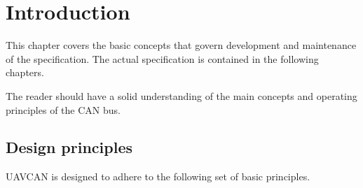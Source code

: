 \chapter{Introduction}\label{sec:introduction}

This chapter covers the basic concepts that govern development and maintenance of the specification.
The actual specification is contained in the following chapters.

The reader should have a solid understanding of the main concepts and operating principles of the CAN bus.

\section{Design principles}

UAVCAN is designed to adhere to the following set of basic principles.

